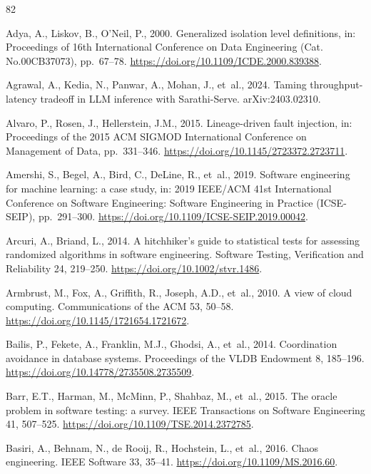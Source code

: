 \documentclass[preprint,3p,authoryear,12pt]{elsarticle}
\begin{document}

\begin{thebibliography}{82}

Adya, A., Liskov, B., O'Neil, P., 2000. Generalized isolation level definitions, in: Proceedings of 16th International Conference on Data Engineering (Cat. No.00CB37073), pp.~67--78. \url{https://doi.org/10.1109/ICDE.2000.839388}.

Agrawal, A., Kedia, N., Panwar, A., Mohan, J., et~al., 2024. Taming throughput-latency tradeoff in LLM inference with Sarathi-Serve. arXiv:2403.02310.

Alvaro, P., Rosen, J., Hellerstein, J.M., 2015. Lineage-driven fault injection, in: Proceedings of the 2015 ACM SIGMOD International Conference on Management of Data, pp.~331--346. \url{https://doi.org/10.1145/2723372.2723711}.

Amershi, S., Begel, A., Bird, C., DeLine, R., et~al., 2019. Software engineering for machine learning: a case study, in: 2019 IEEE/ACM 41st International Conference on Software Engineering: Software Engineering in Practice (ICSE-SEIP), pp.~291--300. \url{https://doi.org/10.1109/ICSE-SEIP.2019.00042}.

Arcuri, A., Briand, L., 2014. A hitchhiker's guide to statistical tests for assessing randomized algorithms in software engineering. Software Testing, Verification and Reliability 24, 219--250. \url{https://doi.org/10.1002/stvr.1486}.

Armbrust, M., Fox, A., Griffith, R., Joseph, A.D., et~al., 2010. A view of cloud computing. Communications of the ACM 53, 50--58. \url{https://doi.org/10.1145/1721654.1721672}.

Bailis, P., Fekete, A., Franklin, M.J., Ghodsi, A., et~al., 2014. Coordination avoidance in database systems. Proceedings of the VLDB Endowment 8, 185--196. \url{https://doi.org/10.14778/2735508.2735509}.

Barr, E.T., Harman, M., McMinn, P., Shahbaz, M., et~al., 2015. The oracle problem in software testing: a survey. IEEE Transactions on Software Engineering 41, 507--525. \url{https://doi.org/10.1109/TSE.2014.2372785}.

Basiri, A., Behnam, N., de Rooij, R., Hochstein, L., et~al., 2016. Chaos engineering. IEEE Software 33, 35--41. \url{https://doi.org/10.1109/MS.2016.60}.


\end{thebibliography}
\end{document}
